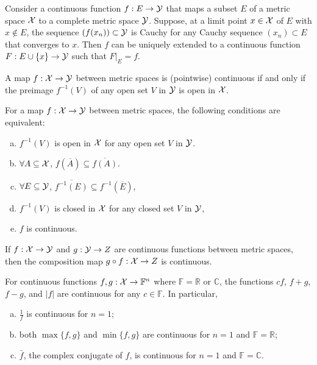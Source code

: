 \begin{thm}
  \label{thm:continuousExtPoint}
  Consider a continuous function $f: E \rightarrow {\cal Y}$ 
  that maps a subset $E$ of a metric space ${\cal X}$
  to a complete metric space ${\cal Y}$.
  Suppose, at a limit point $x\in {\cal X}$ of $E$ with $x\not\in E$, 
  the sequence $(f(x_n))\subset {\cal Y}$ is Cauchy
  for any Cauchy sequence $(x_n)\subset E$ that converges to $x$. 
  Then $f$ can be uniquely extended to a continuous function
  $F: E\cup\{x\}\rightarrow {\cal Y}$ such that
  $F|_{E} = f$.
\end{thm}

\begin{thm}
  \label{thm:contMapOpenPreimage}
  A map $f:{\cal X}\rightarrow {\cal Y}$ between metric spaces
  is (pointwise) continuous if and only if
  the preimage $f^{-1}(V)$ of any open set $V$ in ${\cal Y}$
  is open in ${\cal X}$.
\end{thm}

\begin{thm}
  \label{thm:contMapConditions}
  For a map $f:{\cal X}\rightarrow {\cal Y}$ between metric spaces,
  the following conditions are equivalent:
  \begin{enumerate}[(a)]\itemsep0em
  \item $f^{-1}(V)$ is open in ${\cal X}$ for any open set $V$ in ${\cal Y}$.
  \item $\forall A\subseteq {\cal X}$,
    $f(\overline{A})\subseteq \overline{f(A)}$.
  \item $\forall E\subseteq {\cal Y}$,
    $\overline{f^{-1}(E)}\subseteq f^{-1}(\overline{E})$, 
  \item $f^{-1}(V)$ is closed in ${\cal X}$
    for any closed set $V$ in ${\cal Y}$,
  \item $f$ is continuous. 
  \end{enumerate}
\end{thm}


\begin{lem}
  \label{lem:compositionMapIsContinuous}
  If $f:{\cal X}\rightarrow {\cal Y}$ and $g:{\cal Y}\rightarrow Z$
  are continuous functions between metric spaces,
  then the composition map $g\circ f: {\cal X}\rightarrow Z$
  is continuous.
\end{lem}

\begin{lem}
  \label{lem:elementaryMapIsContinuousNF}
  For continuous functions $f,g:{\cal X}\rightarrow\mathbb{F}^n$ 
  where $\mathbb{F}=\mathbb{R}$ or $\mathbb{C}$, 
  the functions $cf$, $f+g$, $f-g$, and $|f|$
  are continuous for any $c\in\mathbb{F}$.
  In particular, 
  \begin{enumerate}[(a)]\itemsep0em
  \item $\frac{1}{f}$ is continuous for $n=1$;
  \item both $\max\{f,g\}$ and $\min\{f,g\}$
    are continuous for $n=1$ and $\mathbb{F}=\mathbb{R}$;
  \item $\bar{f}$, the complex conjugate of $f$, is continuous
    for $n=1$ and $\mathbb{F}=\mathbb{C}$. 
  \end{enumerate}
\end{lem}



